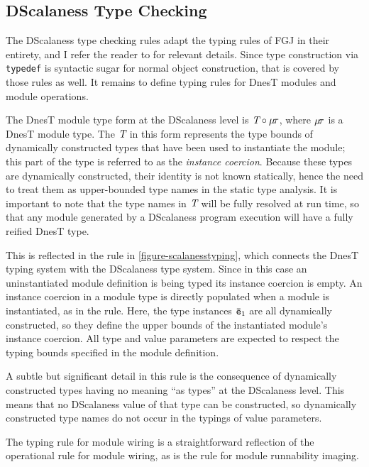 \subsection{DScalaness Type Checking}
\label{section-scalaness-typing}

\scalanesstypingfig

The DScalaness type checking rules adapt the typing rules of FGJ in their entirety, and I refer
the reader to \cite{FJ} for relevant details. Since type construction via \texttt{typedef} is
syntactic sugar for normal object construction, that is covered by those rules as well. It
remains to define typing rules for DnesT modules and module operations.

The DnesT module type form at the DScalaness level is $\textit{T} \circ \mu\!\tau$, where
$\mu\!\tau$ is a DnesT module type. The $\textit{T}$ in this form represents the type bounds of
dynamically constructed types that have been used to instantiate the module; this part of the
type is referred to as the \emph{instance coercion}. Because these types are dynamically
constructed, their identity is not known statically, hence the need to treat them as
upper-bounded type names in the static type analysis. It is important to note that the type
names in $\textit{T}$ will be fully resolved at run time, so that any module generated by a
DScalaness program execution will have a fully reified DnesT type.

This is reflected in the  rule in \autoref{figure-scalanesstyping}, which connects
the DnesT typing system with the DScalaness type system. Since in this case an uninstantiated
module definition is being typed its instance coercion is empty. An instance coercion in a
module type is directly populated when a module is instantiated, as in the 
rule. Here, the type instances ${\mathtt{\bar{e}}}_1$ are all dynamically constructed, so they define the
upper bounds of the instantiated module's instance coercion. All type and value parameters are
expected to respect the typing bounds specified in the module definition.

A subtle but significant detail in this rule is the consequence of dynamically constructed types
having no meaning ``as types'' at the DScalaness level. This means that no DScalaness value of
that type can be constructed, so dynamically constructed type names do not occur in the typings
of value parameters.

The  typing rule for module wiring is a straightforward reflection of the
operational rule for module wiring, as is the  rule for module runnability
imaging.

